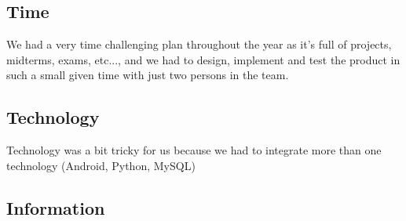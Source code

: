 \subsection{Time}
	We had a very time challenging plan throughout the year as it's full of projects, midterms, exams, etc..., and we had to design, implement and test the product in such a small given time with just two persons in the team.
\subsection{Technology}
	Technology was a bit tricky for us because we had to integrate more than one technology (Android, Python, MySQL) 
\subsection{Information}